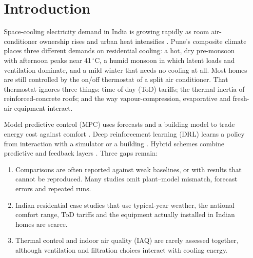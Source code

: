 \section{Introduction}\label{sec:intro}
Space-cooling electricity demand in India is growing rapidly as room air-conditioner
ownership rises and urban heat intensifies \cite{iea2023}. Pune's composite climate
places three different demands on residential cooling: a hot, dry pre-monsoon with
afternoon peaks near 41\,$^\circ$C, a humid monsoon in which latent loads and
ventilation dominate, and a mild winter that needs no cooling at all. Most homes are
still controlled by the on/off thermostat of a split air conditioner. That thermostat
ignores three things: time-of-day (ToD) tariffs; the thermal inertia of reinforced-concrete
roofs; and the way vapour-compression, evaporative and fresh-air equipment interact.

Model predictive control (MPC) uses forecasts and a building model to trade energy cost
against comfort \cite{drgona2020,yao2021}. Deep reinforcement learning (DRL) learns a
policy from interaction with a simulator or a building \cite{yu2021,sierla2022}. Hybrid
schemes combine predictive and feedback layers \cite{arroyo2022}. Three gaps remain:
\begin{enumerate}
  \item Comparisons are often reported against weak baselines, or with results that
        cannot be reproduced. Many studies omit plant--model mismatch, forecast errors
        and repeated runs.
  \item Indian residential case studies that use typical-year weather, the national
        comfort range, ToD tariffs and the equipment actually installed in Indian homes
        are scarce.
  \item Thermal control and indoor air quality (IAQ) are rarely assessed together,
        although ventilation and filtration choices interact with cooling energy.
\end{enumerate}

